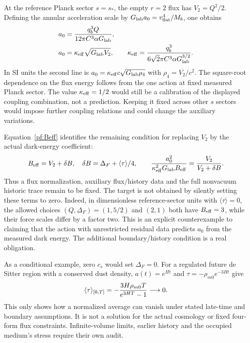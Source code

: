 \documentclass[11pt]{article}
\begin{document}
At the reference Planck sector $s=s_*$, the empty $r=2$ flux has
$V_2=Q^2/2$. Defining the annular acceleration scale by
$G_{\rm lab}a_0=v_{\rm flat}^4/M_b$, one obtains
\begin{align}
 a_0&={q_b^3Q\over12\pi C^3\alpha G_{\rm lab}},\\
 a_0&=\kappa_{\rm eff}\sqrt{G_{\rm lab}V_2},\qquad
 \kappa_{\rm eff}={q_b^3\over
                6\sqrt2\pi C^3\alpha G_{\rm lab}^{3/2}}.
 \label{pf:link}
\end{align}
In SI units the second line is
$a_0=\kappa_{\rm eff}c\sqrt{G_{\rm lab}\rho_4}$ with
$\rho_4=V_2/c^2$. The square-root dependence on the flux energy follows
from the one action at fixed measured Planck sector. The value
$\kappa_{\rm eff}=1/2$ would still be a calibration of the displayed
coupling combination, not a prediction. Keeping it fixed across other
$s$ sectors would impose further coupling relations and could change
the auxiliary variations.

Equation~\eqref{pf:Beff} identifies the remaining condition for replacing
$V_2$ by the actual dark-energy coefficient:
\begin{equation}
 B_{\rm eff}=V_2+\delta B,\quad
 \delta B=\Delta_F+\langle\tau\rangle/4,\qquad
 {a_0^2\over\kappa_{\rm eff}^2G_{\rm lab}B_{\rm eff}}
                   ={V_2\over V_2+\delta B}.
\end{equation}
Thus a flux normalization, auxiliary flux/history data and the full
nonvacuum historic trace remain to be fixed. The target is not obtained
by silently setting these terms to zero.
Indeed, in dimensionless reference-sector units with $\langle\tau\rangle=0$,
the allowed choices $(Q,\Delta_F)=(1,5/2)$ and $(2,1)$ both have
$B_{\rm eff}=3$, while their force scales differ by a factor two.
This is an explicit counterexample to claiming that the action with
unrestricted residual data predicts $a_0$ from the measured dark energy.
The additional boundary/history condition is a real obligation.

As a conditional example, zero $c_s$ would set $\Delta_F=0$.
For a regulated future de Sitter region with a conserved dust density,
$a(t)=e^{Ht}$ and $\tau=-\rho_{m0}e^{-3Ht}$ give
\begin{equation}
 \langle\tau\rangle_{[0,T]}
       =-{3H\rho_{m0}T\over e^{3HT}-1}\longrightarrow0.
\end{equation}
This only shows how a normalized average can vanish under stated late-time
and boundary assumptions. It is not a solution for the actual cosmology
or fixed four-form flux constraints. Infinite-volume limits, earlier
history and the occupied medium's stress require their own audit.
\end{document}
